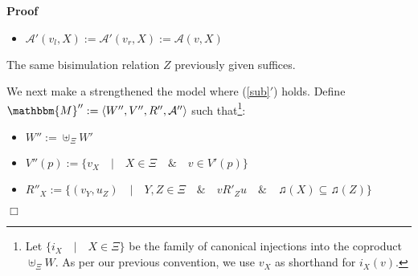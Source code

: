 \documentclass{article}
\newcommand{\assign}{:=}
\newenvironment{itemizedot}{\begin{itemize} \renewcommand{\labelitemi}{$\bullet$}\renewcommand{\labelitemii}{$\bullet$}\renewcommand{\labelitemiii}{$\bullet$}\renewcommand{\labelitemiv}{$\bullet$}}{\end{itemize}}
\newenvironment{proof}{\noindent\textbf{Proof\ }}{\hspace*{\fill}$\Box$\medskip}
\begin{document}
\begin{proof}
\begin{itemizedot}
    \item $\mathcal{A}' (v_l, X) \assign \mathcal{A}' (v_r, X) \assign
    \mathcal{A} (v, X)$
  \end{itemizedot}
  The same bisimulation relation $Z$ previously given suffices.
  
  
  
  We next make a strengthened the model where (\ref{sub}$'$) holds.  Define
  $\mathbbm{M}'' \assign \langle W'', V'', R'', \mathcal{A}'' \rangle$ such
  that{\footnote{Let $\{i_X \hspace{1em} | \hspace{1em} X \in \Xi\}$ be the
  family of canonical injections into the coproduct $\uplus_{\Xi} W$. As per
  our previous convention, we use $v_X$ as shorthand for $i_X (v)$.}}:
  \begin{itemizedot}
    \item $W'' \assign \uplus_{\Xi} W'$
    
    \item $V'' (p) \assign \{v_X \hspace{1em} | \hspace{1em} X \in \Xi
    \hspace{1em} \& \hspace{1em} v \in V' (p)\}$
    
    \item $R''_X \assign \{(v_Y, u_Z) \hspace{1em} | \hspace{1em} Y, Z \in \Xi
    \hspace{1em} \& \hspace{1em} v R'_Z u \hspace{1em} \& \hspace{1em}
    \twonotes (X) \subseteq \twonotes (Z)\}$
    

\end{itemizedot}
\end{proof}
\end{document}
